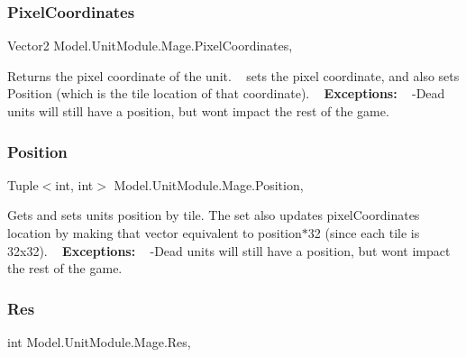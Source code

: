 \subsubsection{\texorpdfstring{Pixel\+Coordinates}{PixelCoordinates}}
{\footnotesize\ttfamily Vector2 Model.\+Unit\+Module.\+Mage.\+Pixel\+Coordinates\hspace{0.3cm}{\ttfamily [get]}, {\ttfamily [set]}}

Returns the pixel coordinate of the unit. ~\newline
 sets the pixel coordinate, and also sets Position (which is the tile location of that coordinate). ~\newline
{\bfseries Exceptions\+:} ~\newline
 -\/\+Dead units will still have a position, but won\textquotesingle{}t impact the rest of the game. \hypertarget{class_model_1_1_unit_module_1_1_mage_a53b0e4a5a23887d56d2b359f676dafa7}{}\label{class_model_1_1_unit_module_1_1_mage_a53b0e4a5a23887d56d2b359f676dafa7} 
\subsubsection{\texorpdfstring{Position}{Position}}
{\footnotesize\ttfamily Tuple$<$int, int$>$ Model.\+Unit\+Module.\+Mage.\+Position\hspace{0.3cm}{\ttfamily [get]}, {\ttfamily [set]}}

Gets and sets unit\textquotesingle{}s position by tile. The set also updates pixel\+Coordinate\textquotesingle{}s location by making that vector equivalent to position$\ast$32 (since each tile is 32x32). ~\newline
 {\bfseries Exceptions\+:} ~\newline
 -\/\+Dead units will still have a position, but won\textquotesingle{}t impact the rest of the game. \hypertarget{class_model_1_1_unit_module_1_1_mage_aaf72ba998d643cbb52930d00a44068bb}{}\label{class_model_1_1_unit_module_1_1_mage_aaf72ba998d643cbb52930d00a44068bb} 
\subsubsection{\texorpdfstring{Res}{Res}}
{\footnotesize\ttfamily int Model.\+Unit\+Module.\+Mage.\+Res\hspace{0.3cm}{\ttfamily [get]}, {\ttfamily [set]}}

